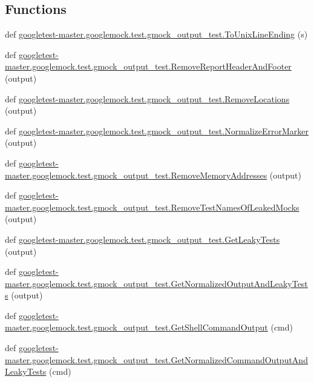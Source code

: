 \subsection*{Functions}
\begin{DoxyCompactItemize}
\item 
def \mbox{\hyperlink{namespacegoogletest-master_1_1googlemock_1_1test_1_1gmock__output__test_a60fe2de77b8c5df0abb239eee6947541}{googletest-\/master.\+googlemock.\+test.\+gmock\+\_\+output\+\_\+test.\+To\+Unix\+Line\+Ending}} (s)
\item 
def \mbox{\hyperlink{namespacegoogletest-master_1_1googlemock_1_1test_1_1gmock__output__test_a36ac7596b56fb98251c967892b3084e8}{googletest-\/master.\+googlemock.\+test.\+gmock\+\_\+output\+\_\+test.\+Remove\+Report\+Header\+And\+Footer}} (output)
\item 
def \mbox{\hyperlink{namespacegoogletest-master_1_1googlemock_1_1test_1_1gmock__output__test_a15fab5a49de017b50f2097718e27a692}{googletest-\/master.\+googlemock.\+test.\+gmock\+\_\+output\+\_\+test.\+Remove\+Locations}} (output)
\item 
def \mbox{\hyperlink{namespacegoogletest-master_1_1googlemock_1_1test_1_1gmock__output__test_ae184ab736471e4c83caf78ad10a728b3}{googletest-\/master.\+googlemock.\+test.\+gmock\+\_\+output\+\_\+test.\+Normalize\+Error\+Marker}} (output)
\item 
def \mbox{\hyperlink{namespacegoogletest-master_1_1googlemock_1_1test_1_1gmock__output__test_a3abad68f2ceddcd56df89df82e0a73ba}{googletest-\/master.\+googlemock.\+test.\+gmock\+\_\+output\+\_\+test.\+Remove\+Memory\+Addresses}} (output)
\item 
def \mbox{\hyperlink{namespacegoogletest-master_1_1googlemock_1_1test_1_1gmock__output__test_ab051f436abf40f52e9b9e1d4e672a553}{googletest-\/master.\+googlemock.\+test.\+gmock\+\_\+output\+\_\+test.\+Remove\+Test\+Names\+Of\+Leaked\+Mocks}} (output)
\item 
def \mbox{\hyperlink{namespacegoogletest-master_1_1googlemock_1_1test_1_1gmock__output__test_ab097fee171feda7db02bd1eb1b405e56}{googletest-\/master.\+googlemock.\+test.\+gmock\+\_\+output\+\_\+test.\+Get\+Leaky\+Tests}} (output)
\item 
def \mbox{\hyperlink{namespacegoogletest-master_1_1googlemock_1_1test_1_1gmock__output__test_a12292601e8aeeb9110380b806c463002}{googletest-\/master.\+googlemock.\+test.\+gmock\+\_\+output\+\_\+test.\+Get\+Normalized\+Output\+And\+Leaky\+Tests}} (output)
\item 
def \mbox{\hyperlink{namespacegoogletest-master_1_1googlemock_1_1test_1_1gmock__output__test_a2665f5cbda1f02e5ed515a5bcfc7babc}{googletest-\/master.\+googlemock.\+test.\+gmock\+\_\+output\+\_\+test.\+Get\+Shell\+Command\+Output}} (cmd)
\item 
def \mbox{\hyperlink{namespacegoogletest-master_1_1googlemock_1_1test_1_1gmock__output__test_acee7eb51bf9983950a6f6847c7541233}{googletest-\/master.\+googlemock.\+test.\+gmock\+\_\+output\+\_\+test.\+Get\+Normalized\+Command\+Output\+And\+Leaky\+Tests}} (cmd)
\end{DoxyCompactItemize}
